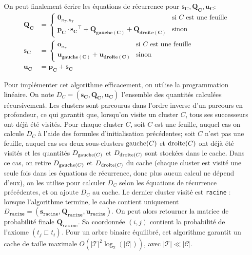 On peut finalement écrire les équations de récurrence pour $\mathbf{s_C}, \mathbf{Q_C}, \mathbf{u_C}$:
\begin{align}
    \mathbf{Q_C} &=
    \begin{cases}
      \mathbf{0}_{n_T,n_T} & \text{si $C$ est une feuille}\\
      \mathbf{p_C} \cdot \mathbf{s_C}^\top + \mathbf{Q_\text{gauche$(C)$}} + \mathbf{Q_\text{droite$(C)$}} & \text{sinon}
    \end{cases}  \\
  \mathbf{s_C} &=
    \begin{cases}
      \mathbf{o}_{n_T} & \text{si $C$ est une feuille}\\
      \mathbf{u_\text{gauche$(C)$}} + \mathbf{u_\text{droite$(C)$}} & \text{sinon}
    \end{cases}  \\
    \mathbf{u_C} &= \mathbf{p_C} + \mathbf{s_C}
\end{align}

Pour implémenter cet algorithme efficacement, on utilise la programmation linéaire. On note $D_C = (\mathbf{s_C}, \mathbf{Q_C}, \mathbf{u_C})$ l'ensemble des quantités calculées récursivement. Les clusters sont parcourus dans l'ordre inverse d'un parcours en profondeur, ce qui garantit que, lorsqu'on visite un cluster $C$, tous ses successeurs ont déjà été visités. Pour chaque cluster $C$, soit $C$ est une feuille, auquel cas on calcule $D_C$ à l'aide des formules d'initialisation précédentes; soit $C$ n'est pas une feuille, auquel cas ses deux sous-clusters $\operatorname{gauche}(C)$ et $\operatorname{droite}(C)$ ont déjà été visités et les quantités $D_{\operatorname{gauche}(C)}$ et $D_{\operatorname{droite}(C)}$ sont stockées dans le cache. Dans ce cas, on retire $D_{\operatorname{gauche}(C)}$ et $D_{\operatorname{droite}(C)}$ du cache (chaque cluster est visité une seule fois dans les équations de récurrence, donc plus aucun calcul ne dépend d'eux), on les utilise pour calculer $D_C$ selon les équations de récurrence précédentes, et on ajoute $D_C$ au cache. Le dernier cluster visité est \texttt{racine} : lorsque l'algorithme termine, le cache contient uniquement $D_\texttt{racine} = (\mathbf{s_\texttt{racine}}, \mathbf{Q_\texttt{racine}}, \mathbf{u_\texttt{racine}})$. On peut alors retourner la matrice de probabilité finale $\mathbf{Q_\texttt{racine}}$. Sa coordonnée $(i, j)$ contient la probabilité de l'axiome $(t_j \sqsubset t_i)$.
Pour un arbre binaire équilibré, cet algorithme garantit un cache de taille maximale $O(|\mathcal{T}|^2 \log_2(| \mathcal{C} |))$, avec $|\mathcal{T}| \ll | \mathcal{C} |$.


